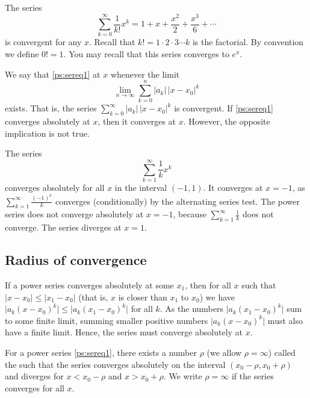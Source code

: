 \begin{example} \label{ps:expex}
The series
\begin{equation*}
\sum_{k=0}^\infty \frac{1}{k!} x^k = 
1 + x + \frac{x^2}{2} + \frac{x^3}{6} + \cdots
\end{equation*}
is convergent for any $x$.
Recall that $k! = 1\cdot 2\cdot 3 \cdots k$ is the
factorial.  By convention we define $0! = 1$.
You may recall that this series
converges to $e^x$.
\end{example}

We say that \eqref{ps:sereq1}
\emph{}
at $x$ whenever the limit
\begin{equation*}
\lim_{n\to\infty} \sum_{k=0}^n
\lvert a_k \rvert \, {\lvert x-x_0 \rvert}^k 
\end{equation*}
exists.  That is, the series
$\sum_{k=0}^\infty \lvert a_k \rvert \, {\lvert x-x_0 \rvert}^k$
is convergent.
If \eqref{ps:sereq1} converges absolutely at $x$, then it
converges at $x$.  However, the opposite implication is not true.

\begin{example} \label{ps:1kex}
The series
\begin{equation*}
\sum_{k=1}^\infty \frac{1}{k} x^k
\end{equation*}
converges absolutely for all $x$ in the interval $(-1,1)$.
It converges at $x=-1$,
as
$\sum_{k=1}^\infty \frac{{(-1)}^k}{k}$ converges (conditionally)
by the alternating series
test.
The power series does not converge absolutely at $x=-1$, because
$\sum_{k=1}^\infty \frac{1}{k}$ does not converge.
The series
diverges at $x=1$.
\end{example}

\subsection{Radius of convergence}

If a power series converges absolutely
at some $x_1$, then for all $x$ such that
$\lvert x - x_0  \rvert \leq \lvert x_1 - x_0 \rvert$ (that is, $x$ is
closer than $x_1$ to $x_0$) we have
$\lvert a_k {(x-x_0)}^k \rvert \leq
\lvert a_k {(x_1-x_0)}^k \rvert$
for all $k$.
As the numbers $\lvert a_k {(x_1-x_0)}^k \rvert$ sum to some finite
limit, summing smaller positive numbers
$\lvert a_k {(x-x_0)}^k \rvert$ must also have a finite limit.
Hence, the series must converge
absolutely at $x$. %

\begin{theorem}
For a power series \eqref{ps:sereq1}, there exists a number
$\rho$ (we allow $\rho=\infty$)
called the \emph{} such that
the series converges absolutely on the interval
$(x_0-\rho,x_0+\rho)$ and diverges for $x < x_0-\rho$ and $x > x_0+\rho$.
We write $\rho=\infty$ if
the series converges for all $x$.
\end{theorem}

